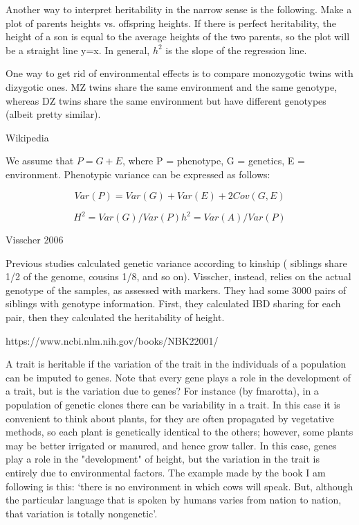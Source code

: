 \documentclass[../main.tex]{subfiles}
\begin{document}
Another way to interpret heritability in the narrow sense is the 
following. Make a plot of parents heights vs. offspring heights. If 
there is perfect heritability, the height of a son is equal to the 
average heights of the two parents, so the plot will be a straight line 
y=x. In general, $h^2$ is the slope of the regression line.

One way to get rid of environmental effects is to compare monozygotic 
twins with dizygotic ones. MZ twins share the same environment and the 
same genotype, whereas DZ twins share the same environment but have 
different genotypes (albeit pretty similar).

Wikipedia

We assume that $P = G + E$, where P = phenotype, G = genetics, E = 
environment. Phenotypic variance can be expressed as follows: 

\begin{equation}
	Var(P) = Var(G) + Var(E) + 2 Cov(G,E)
\end{equation}

\begin{equation}
	H^2 = Var(G) / Var(P)
	h^2 = Var(A) / Var(P)
\end{equation}

Visscher 2006

Previous studies calculated genetic variance according to kinship (\ie 
siblings share 1/2 of the genome, cousins 1/8, and so on). Visscher, 
instead, relies on the actual genotype of the samples, as assessed with 
markers. They had some 3000 pairs of siblings with genotype information. 
First, they calculated IBD sharing for each pair, then they calculated 
the heritability of height.

https://www.ncbi.nlm.nih.gov/books/NBK22001/

A trait is heritable if the variation of the trait in the individuals of 
a population can be imputed to genes. Note that every gene plays a role 
in the development of a trait, but is the variation due to genes? For 
instance (by fmarotta), in a population of genetic clones there can be 
variability in a trait. In this case it is convenient to think about 
plants, for they are often propagated by vegetative methods, so each 
plant is genetically identical to the others; however, some plants may 
be better irrigated or manured, and hence grow taller. In this case, 
genes play a role in the "development" of height, but the variation in 
the trait is entirely due to environmental factors. The example made by 
the book I am following is this: `there is no environment in which cows 
will speak. But, although the particular language that is spoken by 
humans varies from nation to nation, that variation is totally 
nongenetic'.
\end{document}

